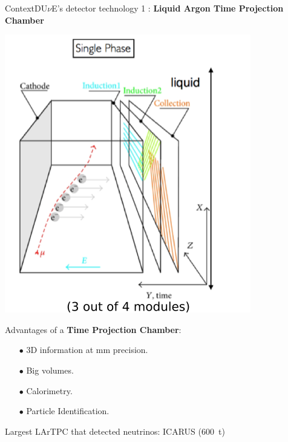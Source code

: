\documentclass[10pt]{beamer}
\begin{document}
    \begin{frame}{Context}{DU$\nu$E's detector technology 1 : \textbf{Liquid Argon Time Projection Chamber}}
    	\begin{scriptsize}
    		\begin{minipage}{0.48\textwidth}
    			\includegraphics[width=\textwidth]{figures/contexte/lartpc.png}\\
    		\end{minipage}
    		\hfill
    		\begin{minipage}{0.48\textwidth}
    			Advantages of a \textbf{Time Projection Chamber}:    			
    			\begin{itemize}
    				\item[$\bullet$] 3D information at \si{\milli\meter} precision.
    				\item[$\bullet$] Big volumes.
    				\item[$\bullet$] Calorimetry.
    				\item[$\bullet$] Particle Identification.
    			\end{itemize}    			
    			Largest LArTPC that detected neutrinos: ICARUS (\SI{600}{\tonne})\\
    			

\end{minipage}
\end{scriptsize}
\end{frame}
\end{document}
